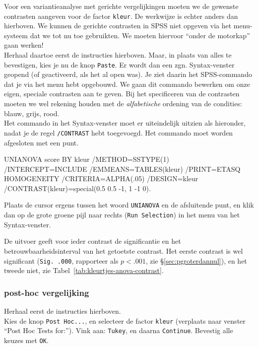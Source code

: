 \documentclass[
]{book}
\newenvironment{Shaded}{\begin{snugshade}}{\end{snugshade}}
\newcommand{\NormalTok}[1]{#1}
\begin{document}
Voor een variantieanalyse met gerichte vergelijkingen moeten we de
gewenste contrasten aangeven voor de factor \texttt{kleur}. De werkwijze is
echter anders dan hierboven. We kunnen de gerichte contrasten in SPSS
niet opgeven via het menu-systeem dat we tot nu toe gebruikten. We
moeten hiervoor ``onder de motorkap'' gaan werken!\\
Herhaal daartoe eerst de instructies hierboven. Maar, in plaats van
alles te bevestigen, kies je nu de knop \texttt{Paste}. Er wordt dan
een zgn. Syntax-venster geopend (of geactiveerd, als het al open was).
Je ziet daarin het SPSS-commando dat je via het menu hebt opgebouwd. We
gaan dit commando bewerken om onze eigen, speciale contrasten aan te
geven. Bij het specificeren van de contrasten moeten we wel rekening
houden met de \emph{alfabetische} ordening van de condities: blauw, grijs,
rood.\\
Het commando in het Syntax-venster moet er uiteindelijk uitzien als
hieronder, nadat je de regel \texttt{/CONTRAST} hebt toegevoegd. Het commando
moet worden afgesloten met een punt.\\

\begin{Shaded}
\begin{Highlighting}[]
\NormalTok{UNIANOVA score BY kleur}
\NormalTok{  /METHOD=SSTYPE(1)}
\NormalTok{  /INTERCEPT=INCLUDE}
\NormalTok{  /EMMEANS=TABLES(kleur) }
\NormalTok{  /PRINT=ETASQ HOMOGENEITY}
\NormalTok{  /CRITERIA=ALPHA(.05)}
\NormalTok{  /DESIGN=kleur}
\NormalTok{  /CONTRAST(kleur)=special(0.5 0.5 {-}1, 1 {-}1 0).}
\end{Highlighting}
\end{Shaded}

Plaats de cursor ergens tussen het woord \texttt{UNIANOVA} en de afsluitende
punt, en klik dan op de grote groene pijl naar rechts (\texttt{Run\ Selection})
in het menu van het Syntax-venster.

De uitvoer geeft voor ieder contrast de significantie en het
betrouwbaarheidsinterval van het getoetste contrast. Het eerste contrast
is wel significant (\texttt{Sig.\ .000}, rapporteer als \(p<.001\), zie §\ref{sec:pgroterdannul}), en het tweede niet, zie
Tabel~\ref{tab:kleurtjes-anova-contrast}.

\subsubsection{post-hoc vergelijking}\label{post-hoc-vergelijking}

Herhaal eerst de instructies hierboven.\\
Kies de knop \texttt{Post\ Hoc...}, en selecteer de factor \texttt{kleur}
(verplaats naar venster ``Post Hoc Tests for:''). Vink aan: \texttt{Tukey}, en
daarna \texttt{Continue}. Bevestig alle keuzes met \texttt{OK}.
\end{document}
